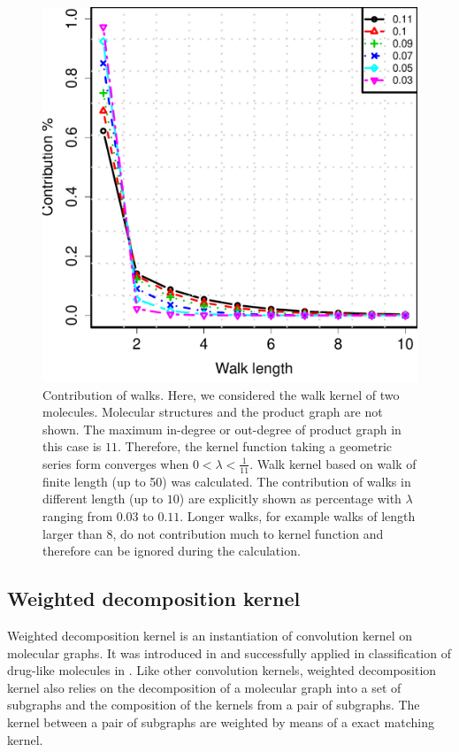 \documentclass[english]{tktltiki}
\begin{document}
\begin{figure}
\begin{center}
\centering
\includegraphics[width=0.70\columnwidth]{./plots/walk_contribution.pdf}
\caption[Contribution of walks in walk kernel.]{Contribution of walks. Here, we considered the walk kernel of two molecules. Molecular structures and the product graph are not shown. The maximum in-degree or out-degree of product graph in this case is $11$. Therefore, the kernel function taking a geometric series form converges when $0<\lambda<\frac{1}{11}$. Walk kernel based on walk of finite length (up to 50) was calculated. The contribution of walks in different length (up to $10$) are explicitly shown as percentage with $\lambda$ ranging from $0.03$ to $0.11$. Longer walks, for example walks of length larger than 8, do not contribution much to kernel function and therefore can be ignored during the calculation.}
\label{walk_contribution}
\end{center}
\end{figure}



\subsection{Weighted decomposition kernel}

Weighted decomposition kernel is an instantiation of convolution kernel \cite{haussler1999} on molecular graphs. It was introduced in \cite{menchetti05} and successfully applied in classification of drug-like molecules in \cite{ceroni07}. Like other convolution kernels, weighted decomposition kernel also relies on the decomposition of a molecular graph into a set of subgraphs and the composition of the kernels from a pair of subgraphs. The kernel between a pair of subgraphs are weighted by means of a exact matching kernel.
\end{document}
